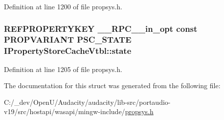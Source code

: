 Definition at line 1200 of file propsys.\+h.

\subsubsection[{\texorpdfstring{state}{state}}]{ {\bf R\+E\+F\+P\+R\+O\+P\+E\+R\+T\+Y\+K\+EY} {\bf \+\_\+\+\_\+\+R\+P\+C\+\_\+\+\_\+in\+\_\+opt} {\bf const} {\bf P\+R\+O\+P\+V\+A\+R\+I\+A\+NT} {\bf P\+S\+C\+\_\+\+S\+T\+A\+TE} I\+Property\+Store\+Cache\+Vtbl\+::state}\hypertarget{struct_i_property_store_cache_vtbl_ad6a7dddbe78fdfce89e1b1dc38fbbb00}{}\label{struct_i_property_store_cache_vtbl_ad6a7dddbe78fdfce89e1b1dc38fbbb00}


Definition at line 1205 of file propsys.\+h.



The documentation for this struct was generated from the following file\+:\begin{DoxyCompactItemize}
\item 
C\+:/\+\_\+dev/\+Open\+U/\+Audacity/audacity/lib-\/src/portaudio-\/v19/src/hostapi/wasapi/mingw-\/include/\hyperlink{propsys_8h}{propsys.\+h}\end{DoxyCompactItemize}

